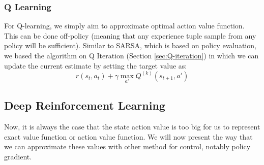 \subsubsection{Q Learning}

For Q-learning, we simply aim to approximate optimal action value function. This can be done off-policy (meaning that any experience tuple sample from any policy will be sufficient). Similar to SARSA, which is based on policy evaluation, we based the algorithm on Q Iteration (Section \ref{sec:Q-iteration}) in which we can update the current estimate by setting the target value as:
\begin{equation}
    r(s_t, a_t) + \gamma \max_{a'} Q^{(k)}(s_{t+1}, a')
\end{equation}


\subsection{Deep Reinforcement Learning}

Now, it is always the case that the state action value is too big for us to represent exact value function or action value function. We will now present the way that we can approximate these values with other method for control, notably policy gradient.

